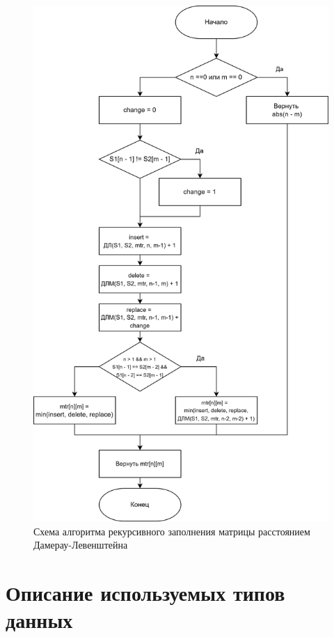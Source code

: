 \documentclass[a4paper,14pt, unknownkeysallowed]{bmstu}
\begin{document}
\begin{figure}[h]
	\centering
	\includegraphics[height=0.8\textheight]{img/dlrechash-2.png}
	\caption{Схема алгоритма рекурсивного заполнения матрицы расстоянием Дамерау-Левенштейна}
	\label{fig:DLrechash2}
\end{figure}

\clearpage

\section{Описание используемых типов данных}
\end{document}

